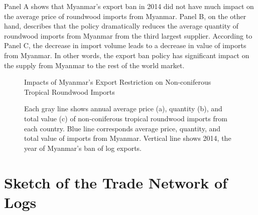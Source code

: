 \documentclass[a4paper,12pt]{article}
\begin{document}
Panel A shows that Myanmar's export ban in 2014 did not have much impact on the average price of roundwood imports from Myanmar. Panel B, on the other hand, describes that the policy dramatically reduces the average quantity of roundwood imports from Myanmar from the third largest supplier. According to Panel C, the decrease in import volume leads to a decrease in value of imports from Myanmar. In other words, the export ban policy has significant impact on the supply from Myanmar to the rest of the world market. 

\begin{figure}[H] 
    \centering
    \caption{Impacts of Myanmar's Export Restriction on Non-coniferous Tropical Roundwood Imports}
    \caption*{\small{Each gray line shows annual average price (a), quantity (b), and total value (c) of non-coniferous tropical roundwood imports from each country. Blue line corresponds average price, quantity, and total value of imports from Myanmar. Vertical line shows 2014, the year of Myanmar's ban of log exports.}}
    \label{fig:shock_Myanmar}
\end{figure}

\section{Sketch of the Trade Network of Logs}
\end{document}
